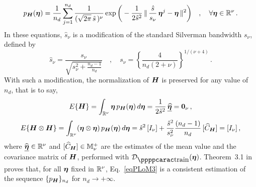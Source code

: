\begin{equation}\label{eqPLoM3}
 p_{\boldsymbol{H}}({\boldsymbol{\eta}}) = \frac{1}{n_d}\sum_{j=1}^{n_d} \frac{1}{ (\sqrt{2\pi}\, \hat s \,)^{\nu}}\exp\bigg ( -\frac{1}{2\hat s^2}\,\Vert\,\frac{\hat s }{s_\nu} \, {\boldsymbol{\eta}}^j - {\boldsymbol{\eta}}\,\Vert^2 \bigg ) \quad , \quad  \forall{\boldsymbol{\eta}}\in{\mathbb{R}}^\nu \, .
\end{equation}
%
In these equations, $\hat s_{\nu}$  is a modification of the standard Silverman bandwidth $s_{\nu}$, defined by
%
\begin{equation}\nonumber
\hat s_{\nu} =   \frac{s_{\nu}}{\sqrt{s_{\nu}^2 +\frac{n_d -1}{n_d}}} \quad , \quad
s_{\nu} = \left\{\frac{4}{n_d(2+\nu)} \right\}^{1/(\nu +4)}   \, .    \nonumber
\end{equation}
%
%
With such a modification, the normalization of ${\boldsymbol{H}}$ is preserved for any value of $n_d$, that is to say,
%
\begin{equation}\nonumber
E\{{\boldsymbol{H}}\} = \int_{{\mathbb{R}}^\nu} {\boldsymbol{\eta}}\, p_{\boldsymbol{H}}({\boldsymbol{\eta}})\, d{\boldsymbol{\eta}} = \frac{1}{2\hat s^2}\,\underline{\widehat{{\boldsymbol{\eta}}}} = { \hbox{\bf 0} }_\nu\, ,
\end{equation}
%
\begin{equation}\nonumber
E\{{\boldsymbol{H}}\otimes{\boldsymbol{H}}\} = \int_{{\mathbb{R}}^\nu} ({\boldsymbol{\eta}}\otimes{\boldsymbol{\eta}})\, p_{\boldsymbol{H}}({\boldsymbol{\eta}})\, d{\boldsymbol{\eta}} = \hat s^2 \,[I_\nu] +
     \frac{\hat s^2}{s_\nu^2} \frac{(n_d-1)}{n_d}\,[\widehat C_{\boldsymbol{H}}] = [I_\nu]\, ,
\end{equation}
%
where $\widehat{\underline{{\boldsymbol{\eta}}}}\in{\mathbb{R}}^\nu$ and $[\widehat C_{\boldsymbol{H}}]\in{\mathbb{M}}_{\nu}^+$ are the estimates of the mean value and the covariance matrix of ${\boldsymbol{H}}$, performed with $\curD_\ptraining(\bfeta)$.
Theorem~3.1 in \cite{Soize2020c} proves that, for all ${\boldsymbol{\eta}}$ fixed in ${\mathbb{R}}^\nu$, Eq.~\eqref{eqPLoM3}  is a consistent estimation of the sequence $\{p_{\boldsymbol{H}}\}_{n_d}$ for $n_d\rightarrow +\infty$.


